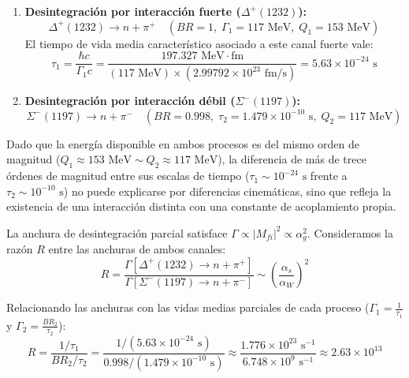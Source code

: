 \begin{enumerate}
    \item \textbf{Desintegración por interacción fuerte ($\Delta^+(1232)$):}
    \begin{equation}
        \Delta^+(1232) \to n + \pi^+ \quad (BR = 1, \; \Gamma_1 = 117 \text{ MeV}, \; Q_1 = 153 \text{ MeV})
    \end{equation}
    El tiempo de vida media característico asociado a este canal fuerte vale:
    \begin{equation}
        \tau_1 = \frac{\hbar c}{\Gamma_1 c} = \frac{197.327 \text{ MeV}\cdot\text{fm}}{(117 \text{ MeV}) \times (2.99792 \times 10^{23} \text{ fm/s})} = 5.63 \times 10^{-24} \text{ s}
    \end{equation}

    \item \textbf{Desintegración por interacción débil ($\Sigma^-(1197)$):}
    \begin{equation}
        \Sigma^-(1197) \to n + \pi^- \quad (BR = 0.998, \; \tau_2 = 1.479 \times 10^{-10} \text{ s}, \; Q_2 = 117 \text{ MeV})
    \end{equation}
\end{enumerate}

Dado que la energía disponible en ambos procesos es del mismo orden de magnitud ($Q_1 \approx 153 \text{ MeV} \sim Q_2 \approx 117 \text{ MeV}$), la diferencia de más de trece órdenes de magnitud entre sus escalas de tiempo ($\tau_1 \sim 10^{-24} \text{ s}$ frente a $\tau_2 \sim 10^{-10} \text{ s}$) no puede explicarse por diferencias cinemáticas, sino que refleja la existencia de una interacción distinta con una constante de acoplamiento propia.

La anchura de desintegración parcial satisface $\Gamma \propto |M_{fi}|^2 \propto \alpha_g^2$. Consideramos la razón $R$ entre las anchuras de ambos canales:
\begin{equation}
    R = \frac{\Gamma[\Delta^+(1232) \to n + \pi^+]}{\Gamma[\Sigma^-(1197) \to n + \pi^-]} \sim \left( \frac{\alpha_s}{\alpha_W} \right)^2
\end{equation}

Relacionando las anchuras con las vidas medias parciales de cada proceso ($\Gamma_1 = \frac{1}{\tau_1}$ y $\Gamma_2 = \frac{BR_2}{\tau_2}$):
\begin{equation}
    R = \frac{1 / \tau_1}{BR_2 / \tau_2} = \frac{1 / (5.63 \times 10^{-24} \text{ s})}{0.998 / (1.479 \times 10^{-10} \text{ s})} \approx \frac{1.776 \times 10^{23} \text{ s}^{-1}}{6.748 \times 10^9 \text{ s}^{-1}} \approx 2.63 \times 10^{13}
\end{equation}

